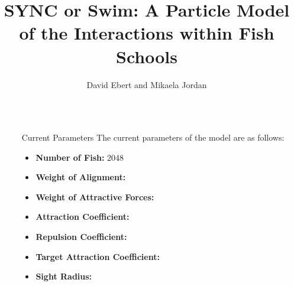 \documentclass[final, xcolor=dvipsnames]{beamer}
\title{SYNC or Swim: A Particle Model of the Interactions within Fish Schools} %
\author{David Ebert and Mikaela Jordan} %
\institute{Tarleton State University Department of Mathematics} %
\newlength{\sepwid}
\newlength{\onecolwid}
\begin{document}

\setlength{\belowcaptionskip}{2ex} %
\setlength\belowdisplayshortskip{2ex} %

\begin{frame}[t] %

\begin{columns}[t] %

\begin{column}{\sepwid}\end{column} %

\begin{column}{\onecolwid} %


\begin{alertblock}{Current Parameters}
The current parameters of the model are as follows:
\begin{itemize}
\item \textbf{Number of Fish:} \hfill 2048 
\item \textbf{Weight of Alignment:} \hfill 
\item \textbf{Weight of Attractive Forces:}
\item \textbf{Attraction Coefficient:}
\item \textbf{Repulsion Coefficient:}
\item \textbf{Target Attraction Coefficient:}
\item \textbf{Sight Radius:}
\end{itemize}

\end{alertblock}



\end{column}
\end{columns}
\end{frame}
\end{document}
